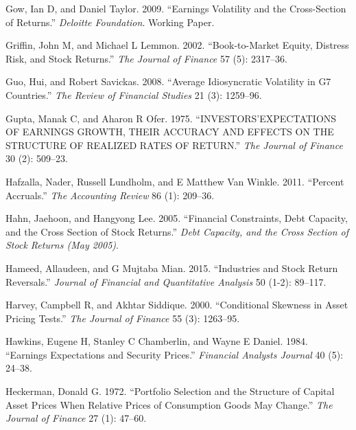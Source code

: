 \documentclass[
  letterpaper,
  DIV=11,
  numbers=noendperiod]{scrreprt}
\newlength{\cslhangindent}
\newlength{\cslentryspacingunit} %
\newenvironment{CSLReferences}[2] %
 {%
  \setlength{\parindent}{0pt}
  \ifodd #1
  \let\oldpar\par
  \def\par{\hangindent=\cslhangindent\oldpar}
  \fi
  \setlength{\parskip}{#2\cslentryspacingunit}
 }%
 {}
\begin{document}
\begin{CSLReferences}{1}{0}
\leavevmode{}%
Gow, Ian D, and Daniel Taylor. 2009. {``Earnings Volatility and the
Cross-Section of Returns.''} \emph{Deloitte Foundation}. Working Paper.

\leavevmode{}%
Griffin, John M, and Michael L Lemmon. 2002. {``Book-to-Market Equity,
Distress Risk, and Stock Returns.''} \emph{The Journal of Finance} 57
(5): 2317--36.

\leavevmode{}%
Guo, Hui, and Robert Savickas. 2008. {``Average Idiosyncratic Volatility
in G7 Countries.''} \emph{The Review of Financial Studies} 21 (3):
1259--96.

\leavevmode{}%
Gupta, Manak C, and Aharon R Ofer. 1975. {``INVESTORS'EXPECTATIONS OF
EARNINGS GROWTH, THEIR ACCURACY AND EFFECTS ON THE STRUCTURE OF REALIZED
RATES OF RETURN.''} \emph{The Journal of Finance} 30 (2): 509--23.

\leavevmode{}%
Hafzalla, Nader, Russell Lundholm, and E Matthew Van Winkle. 2011.
{``Percent Accruals.''} \emph{The Accounting Review} 86 (1): 209--36.

\leavevmode{}%
Hahn, Jaehoon, and Hangyong Lee. 2005. {``Financial Constraints, Debt
Capacity, and the Cross Section of Stock Returns.''} \emph{Debt
Capacity, and the Cross Section of Stock Returns (May 2005)}.

\leavevmode{}%
Hameed, Allaudeen, and G Mujtaba Mian. 2015. {``Industries and Stock
Return Reversals.''} \emph{Journal of Financial and Quantitative
Analysis} 50 (1-2): 89--117.

\leavevmode{}%
Harvey, Campbell R, and Akhtar Siddique. 2000. {``Conditional Skewness
in Asset Pricing Tests.''} \emph{The Journal of Finance} 55 (3):
1263--95.

\leavevmode{}%
Hawkins, Eugene H, Stanley C Chamberlin, and Wayne E Daniel. 1984.
{``Earnings Expectations and Security Prices.''} \emph{Financial
Analysts Journal} 40 (5): 24--38.

\leavevmode{}%
Heckerman, Donald G. 1972. {``Portfolio Selection and the Structure of
Capital Asset Prices When Relative Prices of Consumption Goods May
Change.''} \emph{The Journal of Finance} 27 (1): 47--60.


\end{CSLReferences}
\end{document}
